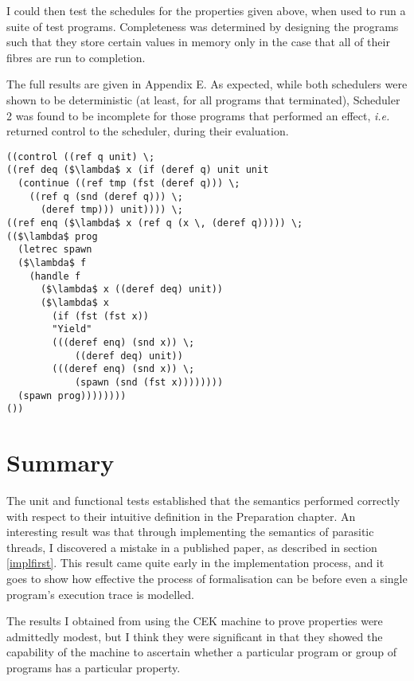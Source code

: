 \documentclass[12pt,a4paper,twoside,openright]{report}
\begin{document}
I could then test the schedules for the properties given above, when used to run a suite of test programs. Completeness was determined by designing the programs such that they store certain values in memory only in the case that all of their fibres are run to completion.

The full results are given in Appendix E. As expected, while both schedulers were shown to be deterministic (at least, for all programs that terminated), Scheduler 2 was found to be incomplete for those programs that performed an effect, \textit{i.e.} returned control to the scheduler, during their evaluation.

\begin{minipage}{\linewidth} \begin{lstlisting}[caption=Scheduler 1 in \texttt{Alg},label={lst:sched1}]
((control ((ref q unit) \;
((ref deq ($\lambda$ x (if (deref q) unit unit
  (continue ((ref tmp (fst (deref q))) \;
    ((ref q (snd (deref q))) \;
      (deref tmp))) unit)))) \;
((ref enq ($\lambda$ x (ref q (x \, (deref q))))) \;
(($\lambda$ prog
  (letrec spawn 
  ($\lambda$ f 
    (handle f 
      ($\lambda$ x ((deref deq) unit)) 
      ($\lambda$ x 
        (if (fst (fst x)) 
        "Yield" 
        (((deref enq) (snd x)) \;
            ((deref deq) unit)) 
        (((deref enq) (snd x)) \;
            (spawn (snd (fst x))))))))
  (spawn prog))))))))
())
\end{lstlisting} \end{minipage}

\section{Summary}

The unit and functional tests established that the semantics performed correctly with respect to their intuitive definition in the Preparation chapter. An interesting result was that through implementing the semantics of parasitic threads, I discovered a mistake in a published paper, as described in section \ref{implfirst}. This result came quite early in the implementation process, and it goes to show how effective the process of formalisation can be before even a single program's execution trace is modelled.

The results I obtained from using the CEK machine to prove properties were admittedly modest, but I think they were significant in that they showed the capability of the machine to ascertain whether a particular program or group of programs has a particular property.
\end{document}
